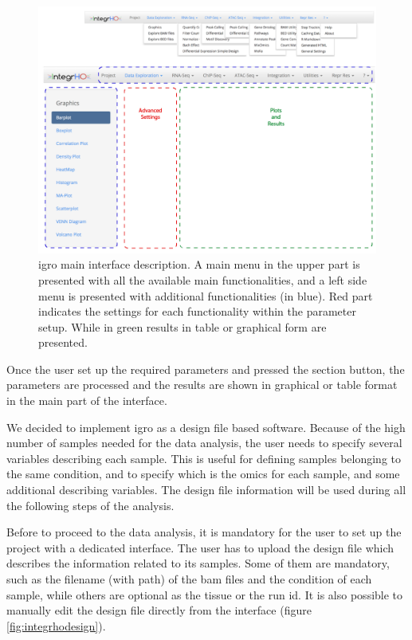 \begin{figure}[H]
\centering
\includegraphics[width=\textwidth, keepaspectratio]{img/integrho/interface.png}
\caption[\gls{igro} main interface]{\gls{igro} main interface description. A main menu in the upper part is presented with all the available main functionalities, and a left side menu is presented with additional functionalities (in blue). Red part indicates the settings for each functionality within the parameter setup. While in green results in table or graphical form are presented.}
\label{fig:integrhomain}
\end{figure}

Once the user set up the required parameters and pressed the section button, the parameters are processed and the results are shown in graphical or table format in the main part of the interface.

We decided to implement \gls{igro} as a design file based software.
Because of the high number of samples needed for the data analysis, the user needs to specify several variables describing each sample.
This is useful for defining samples belonging to the same condition, and to specify which is the omics for each sample, and some additional describing variables.
The design file information will be used during all the following steps of the analysis.

Before to proceed to the data analysis, it is mandatory for the user to set up the project with a dedicated interface.
The user has to upload the design file which describes the information related to its samples.
Some of them are mandatory, such as the filename (with path) of the \gls{bam} files and the condition of each sample, while others are optional as the tissue or the run id. 
It is also possible to manually edit the design file directly from the interface (figure \ref{fig:integrhodesign}).

